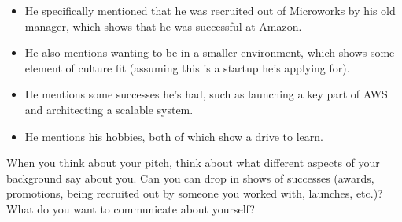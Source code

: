 \documentclass{report}
\begin{document}
\begin{itemize}
\begin{itemize}
                \item He specifically mentioned that he was recruited out of Microworks by his old manager, which shows that he was successful at Amazon.
                \item He also mentions wanting to be in a smaller environment, which shows some element of culture fit (assuming this is a startup he's applying for).
                \item He mentions some successes he's had, such as launching a key part of AWS and architecting a scalable system.
                \item He mentions his hobbies, both of which show a drive to learn.
            \end{itemize}
            When you think about your pitch, think about what different aspects of your background say about you. Can you can drop in shows of successes (awards, promotions, being recruited out by someone you worked with, launches, etc.)? What do you want to communicate about yourself?

    \end{itemize}
\end{document}
